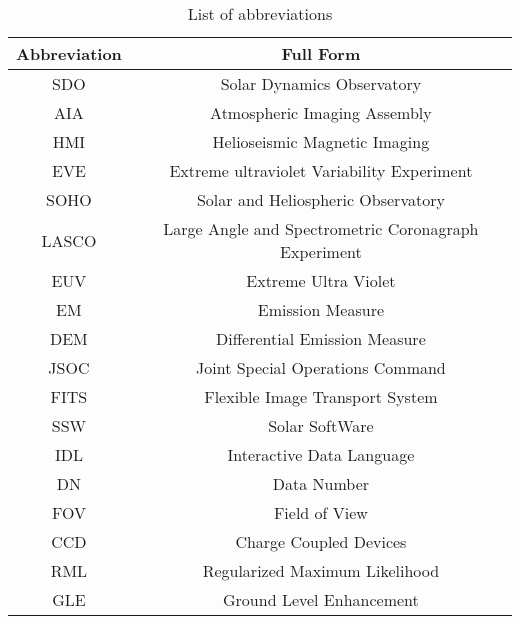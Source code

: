 \thispagestyle{empty}


\begin{table*}[h!]
    \centering
    \setlength{\tabcolsep}{10pt}
    \renewcommand{\arraystretch}{1.5}
    \begin{tabular}{ | c | c | }
      \hline
      \textbf{Abbreviation} & \textbf{Full Form} \\
      \hline
      SDO & Solar Dynamics Observatory \\
      AIA & Atmospheric Imaging Assembly \\
      HMI & Helioseismic Magnetic Imaging \\
      EVE & Extreme ultraviolet Variability Experiment \\
      SOHO & Solar and Heliospheric Observatory \\
      LASCO & Large Angle and Spectrometric Coronagraph Experiment \\
      EUV & Extreme Ultra Violet \\
      EM & Emission Measure \\
      DEM & Differential Emission Measure \\
      JSOC & Joint Special Operations Command \\
      FITS & Flexible Image Transport System \\
      SSW & Solar SoftWare \\
      IDL & Interactive Data Language \\
      DN & Data Number \\
      FOV & Field of View \\
      CCD & Charge Coupled Devices \\
      RML & Regularized Maximum Likelihood \\
      GLE & Ground Level Enhancement \\
      \hline
    \end{tabular}
    \caption{List of abbreviations}
    \label{table:abbr}
\end{table*}

